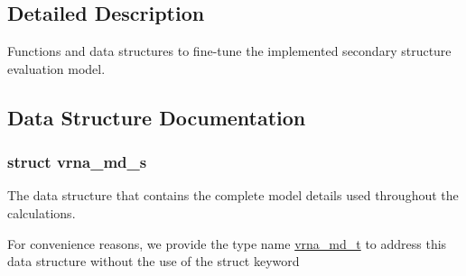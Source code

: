 \subsection{Detailed Description}
Functions and data structures to fine-\/tune the implemented secondary structure evaluation model. 



\subsection{Data Structure Documentation}
\label{structvrna__md__s}
\subsubsection{struct vrna\+\_\+md\+\_\+s}
The data structure that contains the complete model details used throughout the calculations. 

For convenience reasons, we provide the type name \hyperlink{group__model__details_ga1f8a10e12a0a1915f2a4eff0b28ea17c}{vrna\+\_\+md\+\_\+t} to address this data structure without the use of the struct keyword

